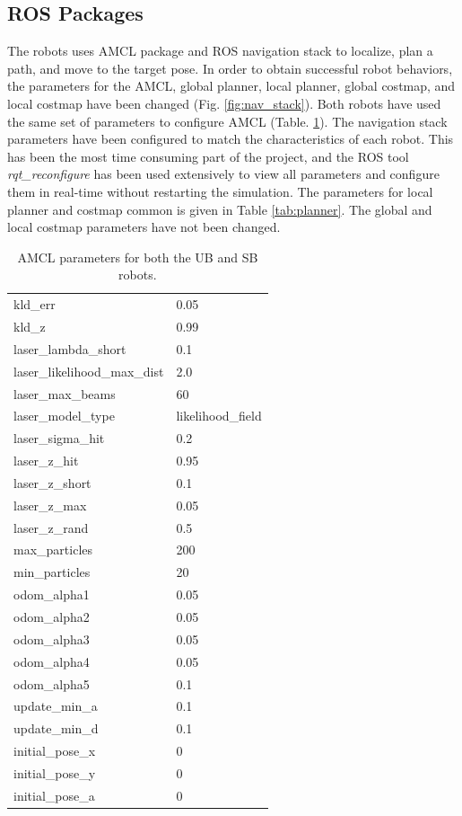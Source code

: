 \documentclass[10pt,journal,compsoc]{IEEEtran}
\begin{document}
\subsection{ROS Packages}

The robots uses AMCL package and ROS navigation stack to localize, plan a path, and move to the target pose.  In order to obtain successful robot behaviors, the parameters for the AMCL, global planner, local planner, global costmap, and local costmap have been changed (Fig. \ref{fig:nav_stack}).   Both robots have used the same set of parameters to configure AMCL (Table. \ref{tab:amcl_loc}).  The navigation stack parameters have been configured to match the characteristics of each robot. This has been the most time consuming part of the project, and the ROS tool \textit{rqt\_reconfigure} has been used extensively to view all parameters and configure them in real-time without restarting the simulation. The parameters for local planner and costmap common is given in Table \ref{tab:planner}. The global and local costmap parameters have not been changed.

\begin{table}[h]
\caption{AMCL parameters for both the UB and SB robots.}
\label{tab:amcl_loc}
\begin{center}
\begin{tabular}{|l|l|}
\hline
kld\_err & 0.05\\
kld\_z & 0.99\\
laser\_lambda\_short & 0.1 \\
laser\_likelihood\_max\_dist & 2.0\\
laser\_max\_beams & 60 \\
laser\_model\_type &  likelihood\_field\\
laser\_sigma\_hit & 0.2\\
laser\_z\_hit & 0.95\\
laser\_z\_short & 0.1 \\
laser\_z\_max & 0.05 \\
laser\_z\_rand & 0.5\\
max\_particles & 200\\
min\_particles & 20\\
odom\_alpha1 & 0.05\\
odom\_alpha2& 0.05\\
odom\_alpha3& 0.05\\
odom\_alpha4& 0.05\\
odom\_alpha5& 0.1\\
update\_min\_a & 0.1\\
update\_min\_d & 0.1 \\
initial\_pose\_x & 0\\
initial\_pose\_y & 0\\
initial\_pose\_a & 0\\
\hline
\end{tabular}
\end{center}
\end{table}
\end{document}
